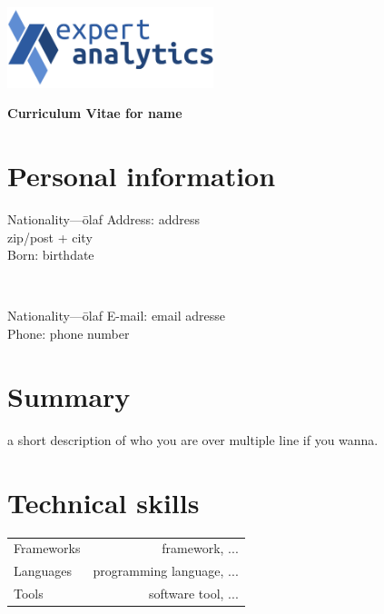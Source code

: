 \documentclass[english,a4paper,11pt]{article}
\begin{document}
\pagestyle{fancy}
\vspace*{-2cm}
\hspace*{10cm}\includegraphics[width=6cm]{logo.pdf}
\vspace*{1cm}

\noindent
{\LARGE \bfseries \color{xaldark}Curriculum Vitae for name}

\Needspace{\cvneedspaceconst\baselineskip}
\section*{Personal information}
\begin{minipage}[t]{0.4\textwidth}
\begin{tabbing}Nationality---\=olaf\kill
Address: \> address \\
\> zip/post + city \\
Born: \>birthdate \\
\end{tabbing}
\end{minipage}
$\quad\quad$
\begin{minipage}[t]{0.3\textwidth}
\begin{tabbing}Nationality---\=olaf\kill
E-mail: \>email adresse \\
Phone: \>phone number \\

\end{tabbing}
\end{minipage}


\section*{Summary}

a short description of who you are over multiple line if you wanna.
\\
\Needspace{\cvneedspaceconst\baselineskip}
\section*{Technical skills}
\begin{longtable}{LR}
Frameworks & framework, ...\\ 
Languages & programming language, ...\\ 
Tools & software tool, ...\\ 
\end{longtable}
\end{document}
